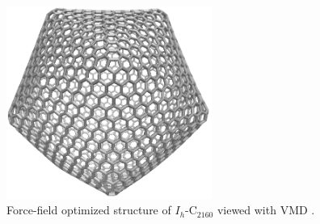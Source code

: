 \documentclass[article,a4paper,twoside]{memoir}
\newcommand{\C}[1]{\ensuremath{\mathrm{C}_{#1}}}
\begin{document}
 \begin{figure}[htbp]
	\centering
  		 \includegraphics[width=0.6\textwidth]{C2160.png}
     \caption{Force-field optimized structure of $I_h$-\C{2160} viewed with VMD \cite{vmd}.}
     \label{pic:Finalgraph}
 \end{figure}
\end{document}
